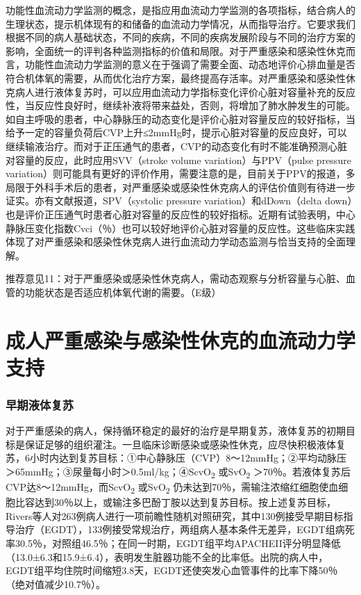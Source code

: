 功能性血流动力学监测的概念，是指应用血流动力学监测的各项指标，结合病人的生理状态，提示机体现有的和储备的血流动力学情况，从而指导治疗。它要求我们根据不同的病人基础状态，不同的疾病，不同的疾病发展阶段与不同的治疗方案的影响，全面统一的评判各种监测指标的价值和局限。对于严重感染和感染性休克而言，功能性血流动力学监测的意义在于强调了需要全面、动态地评价心排血量是否符合机体氧的需要，从而优化治疗方案，最终提高存活率。对严重感染和感染性休克病人进行液体复苏时，可以应用血流动力学指标变化评价心脏对容量补充的反应性，当反应性良好时，继续补液将带来益处，否则，将增加了肺水肿发生的可能。如自主呼吸的患者，中心静脉压的动态变化是评价心脏对容量反应的较好指标，当给予一定的容量负荷后CVP上升≤2mmHg时，提示心脏对容量的反应良好，可以继续输液治疗。而对于正压通气的患者，CVP的动态变化有时不能准确预测心脏对容量的反应，此时应用SVV（stroke
volume variation）与PPV（pulse pressure
variation）则可能具有更好的评价作用，需要注意的是，目前关于PPV的报道，多局限于外科手术后的患者，对严重感染或感染性休克病人的评估价值则有待进一步证实。亦有文献报道，SPV（systolic
pressure variation）和dDown（delta
down）也是评价正压通气时患者心脏对容量的反应性的较好指标。近期有试验表明，中心静脉压变化指数Cvci（％）也可以较好地评价心脏对容量的反应性。这些临床实践体现了对严重感染和感染性休克病人进行血流动力学动态监测与恰当支持的全面理解。

推荐意见11：对于严重感染或感染性休克病人，需动态观察与分析容量与心脏、血管的功能状态是否适应机体氧代谢的需要。（E级）

\section{成人严重感染与感染性休克的血流动力学支持}

\subsubsection{早期液体复苏}

对于严重感染的病人，保持循环稳定的最好的治疗是早期复苏，液体复苏的初期目标是保证足够的组织灌注。一旦临床诊断感染或感染性休克，应尽快积极液体复苏，6小时内达到复苏目标：①中心静脉压（CVP）8～12mmHg；②平均动脉压＞65mmHg；③尿量每小时＞0.5ml/kg；④ScvO\textsubscript{2}
或SvO\textsubscript{2}
＞70％。若液体复苏后CVP达8～12mmHg，而ScvO\textsubscript{2}
或SvO\textsubscript{2}
仍未达到70％，需输注浓缩红细胞使血细胞比容达到30％以上，或输注多巴酚丁胺以达到复苏目标。按上述复苏目标，Rivers等人对263例病人进行一项前瞻性随机对照研究，其中130例接受早期目标指导治疗（EGDT），133例接受常规治疗，两组病人基本条件无差异，EGDT组病死率30.5％，对照组46.5％；在同一时期，EGDT组平均APACHEII评分明显降低（13.0±6.3和15.9±6.4），表明发生脏器功能不全的比率低。出院的病人中，EGDT组平均住院时间缩短3.8天，EGDT还使突发心血管事件的比率下降50％（绝对值减少10.7％）。

